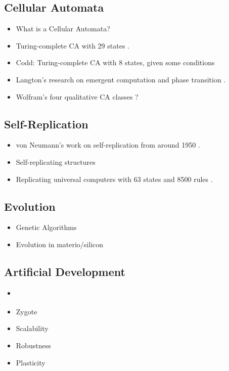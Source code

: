 \TODO

\subsection{Cellular Automata}

\begin{itemize}
    \item What is a Cellular Automata?
    \item Turing-complete CA with 29 states \cite{neumann1966selfreplication}.
    \item Codd: Turing-complete CA with 8 states, given some conditions \cite{codd1968cellular}
    \item Langton's research on emergent computation and phase transition \cite{langton1990edgeofchaos}.
    \item Wolfram's four qualitative CA classes \cite{wolfram1984complexity}?
\end{itemize}

\subsection{Self-Replication}

\begin{itemize}
    \item von Neumann's work on self-replication from around 1950 \cite{neumann1966selfreplication}.
    \item Self-replicating structures \cite{reggia1998neumann}
    \item Replicating universal computers with 63 states and 8500 rules \cite{perrier1996toward}.
\end{itemize}

\subsection{Evolution}

\begin{itemize}
    \item Genetic Algorithms
    \item Evolution in materio/silicon \cite{miller2014evolution}
\end{itemize}

\subsection{Artificial Development}

\begin{itemize}
    \item \cite{harding2008artificial} \cite{tufte2008evodevo}
    \item Zygote
    \item Scalability
    \item Robustness
    \item Plasticity
\end{itemize}

